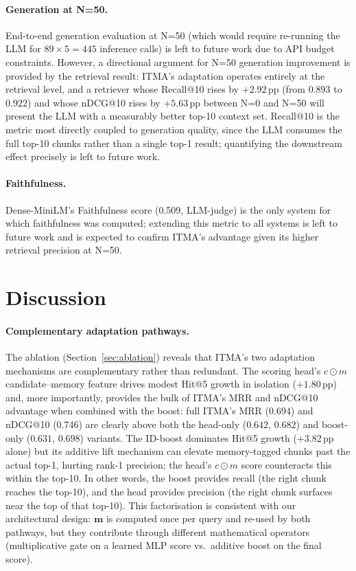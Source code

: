 \documentclass[preprint,12pt]{elsarticle}
\begin{document}
\paragraph{Generation at N=50.}
End-to-end generation evaluation at N=50 (which would require re-running the
LLM for $89\times5{=}445$ inference calls) is left to future work due to
API budget constraints.  However, a directional argument for N=50 generation
improvement is provided by the retrieval result: ITMA's adaptation operates
entirely at the retrieval level, and a retriever whose Recall@10 rises by
$+2.92$\,pp (from $0.893$ to $0.922$) and whose nDCG@10 rises by $+5.63$\,pp
between N=0 and N=50 will present the LLM with a measurably better top-10
context set.  Recall@10 is the metric most directly coupled to generation
quality, since the LLM consumes the full top-10 chunks rather than a single
top-1 result; quantifying the downstream effect precisely is left to future
work.

\paragraph{Faithfulness.}
Dense-MiniLM's Faithfulness score (0.509, LLM-judge) is the only system for
which faithfulness was computed; extending this metric to all systems is
left to future work and is expected to confirm ITMA's
advantage given its higher retrieval precision at N=50.

\section{Discussion}
\label{sec:discussion}

\paragraph{Complementary adaptation pathways.}
The ablation (Section~\ref{sec:ablation}) reveals that ITMA's two
adaptation mechanisms are complementary rather than redundant.  The
scoring head's $c{\odot}m$ candidate--memory feature drives modest Hit@5
growth in isolation ($+1.80$\,pp) and, more importantly, provides the bulk
of ITMA's MRR and nDCG@10 advantage when combined with the boost: full
ITMA's MRR (0.694) and nDCG@10 (0.746) are clearly above both the
head-only ($0.642$, $0.682$) and boost-only ($0.631$, $0.698$) variants.
The ID-boost dominates Hit@5 growth ($+3.82$\,pp alone) but its
additive lift mechanism can elevate memory-tagged chunks past the actual
top-1, hurting rank-1 precision; the head's $c{\odot}m$ score
counteracts this within the top-10.  In other words, the boost provides
recall (the right chunk reaches the top-10), and the head provides
precision (the right chunk surfaces near the top of that top-10).  This
factorisation is consistent with our architectural design: $\mathbf{m}$
is computed once per query and re-used by both pathways, but they
contribute through different mathematical operators (multiplicative gate
on a learned MLP score vs.\ additive boost on the final score).
\end{document}
